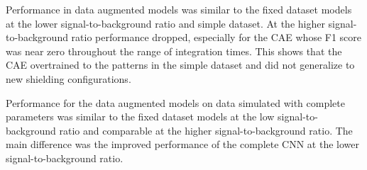 Performance in data augmented models was similar to the fixed dataset models at the lower signal-to-background ratio and simple dataset. At the higher signal-to-background ratio performance dropped, especially for the CAE whose F1 score was near zero throughout the range of integration times. This shows that the CAE overtrained to the patterns in the simple dataset and did not generalize to new shielding configurations.

Performance for the data augmented models on data simulated with complete parameters was similar to the fixed dataset models at the low signal-to-background ratio and comparable at the higher signal-to-background ratio. The main difference was the improved performance of the complete CNN at the lower signal-to-background ratio.




